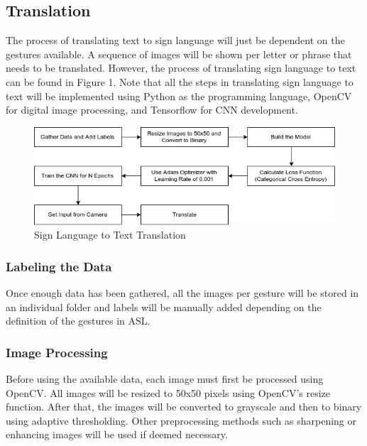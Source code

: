\documentclass[journal]{./IEEE/IEEEtran}
\begin{document}
\subsection{Translation}
The process of translating text to sign language will just be dependent on the gestures available. A sequence of images will be shown per letter or phrase that needs to be translated. However, the process of translating sign language to text can be found in Figure 1. Note that all the steps in translating sign language to text will be implemented using Python as the programming language, OpenCV for digital image processing, and Tensorflow for CNN development.
\newline
\newline
\newline
\newline
\newline

\begin{figure}[ht!]
    \centering
    \includegraphics[width=1\linewidth]{./images/methodology.png}
    \caption{Sign Language to Text Translation}
    \label{fig:label1}
\end{figure}

\subsubsection{Labeling the Data}
Once enough data has been gathered, all the images per gesture will be stored in an individual folder and labels will be manually added depending on the definition of the gestures in ASL.
\newline
\subsubsection{Image Processing}
Before using the available data, each image must first be processed using OpenCV. All images will be resized to 50x50 pixels using OpenCV's resize function. After that, the images will be converted to grayscale and then to binary using adaptive thresholding. Other preprocessing methods such as sharpening or enhancing images will be used if deemed necessary.
\newline
\end{document}
